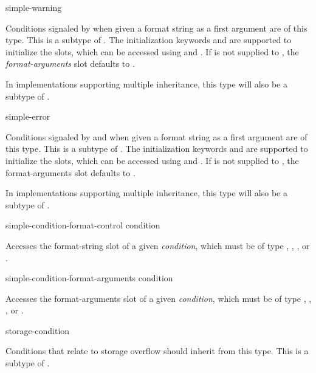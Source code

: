 \begin{defun}[Type]
simple-warning

Conditions signaled by  when given a format string as a first argument
are of this type. This is a subtype of .  The initialization
keywords  and  are supported to
initialize the slots, which can be accessed using
 and
.  If  is not
supplied to , the \emph{format-arguments} slot defaults to
.

In implementations supporting multiple inheritance, this type will also be a
subtype of .
\end{defun}

\begin{defun}[Type]
simple-error

Conditions signaled by  and  when given a format string
as a first argument are of this type. This is a subtype of .  The
initialization keywords  and  are
supported to initialize the slots, which can be accessed using
 and
.  If  is not
supplied to , the format-arguments slot defaults to
.

In implementations supporting multiple inheritance, this type will also be a
subtype of .
\end{defun}

\begin{defun}[Function]
simple-condition-format-control condition

Accesses the format-string slot of a given \emph{condition}, which must be of
type , , , or
.
\end{defun}

\begin{defun}[Function]
simple-condition-format-arguments condition

Accesses the format-arguments slot of a given \emph{condition}, which must be of
type , , , or
.
\end{defun}

\begin{defun}[Type]
storage-condition

Conditions that relate to storage overflow should inherit from this type.  This
is a subtype of .
\end{defun}

